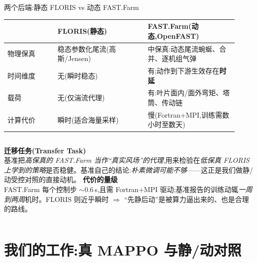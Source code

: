 \documentclass[aspectratio=169,11pt,UTF8]{ctexbeamer}
\newcommand{\emphb}[1]{\textcolor{myred}{\textbf{#1}}}
\begin{document}
\begin{frame}{两个后端:静态 FLORIS vs 动态 FAST.Farm}
\small
\begin{center}\renewcommand{\arraystretch}{1.2}
\begin{tabular}{@{}p{0.2\linewidth} p{0.36\linewidth} p{0.36\linewidth}@{}}
\toprule
 & \textbf{FLORIS(静态)} & \textbf{FAST.Farm(动态,OpenFAST)} \\
\midrule
物理保真 & 稳态参数化尾流(高斯/Jensen) & 中保真:动态尾流蜿蜒、合并、逐机组气弹 \\
时间维度 & 无(瞬时稳态) & 有;动作到下游生效存在\emphb{时延} \\
载荷 & 无(仅湍流代理) & 有:叶片面内/面外弯矩、塔筒、传动链 \\
计算代价 & 瞬时(适合海量采样) & 慢(Fortran+MPI,训练需数小时至数天) \\
\bottomrule
\end{tabular}
\end{center}
\vspace{1mm}
\begin{columns}[T]
\textbf{迁移任务(Transfer Task)}\\
基准把\emph{高保真的 FAST.Farm 当作“真实风场”的代理},用来检验在\emph{低保真 FLORIS 上学到的策略}是否稳健。基准自己的结论:\emph{朴素微调可能不够}——这正是我们做静/动受控对照的直接动机。
\textbf{代价的量级}\\
FAST.Farm 每个控制步 $\sim\!0.6$\,s,且需 Fortran$+$MPI 驱动;基准报告的训练动辄\emph{一周到两周}机时。FLORIS 则近乎瞬时 $\Rightarrow$ “先静后动”是被算力逼出来的、也是合理的路线。
\end{columns}
\end{frame}

\section{我们的工作:真 MAPPO 与静/动对照}
\end{document}
